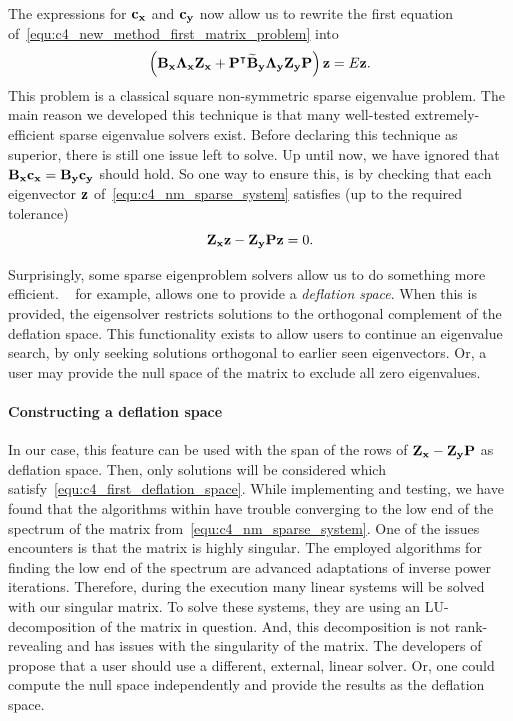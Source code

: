 The expressions for $\vb{c_x}$ and $\vb{c_y}$ now allow us to rewrite the first equation of~\eqref{equ:c4_new_method_first_matrix_problem} into
\begin{equation}\label{equ:c4_nm_sparse_system}
    \left(\vb{B_x}\vb{\Lambda_x} \vb{Z_x} + {\vb{P}}^\intercal\vb{\widetilde{B}_y}\vb{\Lambda_y}  \vb{Z_y} \vb{P}\right) \vb{z} = E \vb{z} \text{.}
\end{equation}
This problem is a classical square non-symmetric sparse eigenvalue problem. The main reason we developed this technique is that many well-tested extremely-efficient sparse eigenvalue solvers exist. Before declaring this technique as superior, there is still one issue left to solve. Up until now, we have ignored that $\vb{B_x} \vb{c_x} = \vb{B_y} \vb{c_y}$ should hold. So one way to ensure this, is by checking that each eigenvector $\vb{z}$ of~\eqref{equ:c4_nm_sparse_system} satisfies (up to the required tolerance)
\begin{equation}\label{equ:c4_first_deflation_space}
    \vb{Z_x} \vb{z} -\vb{Z_y} \vb{P} \vb{z} =0 \text{.}
\end{equation}

Surprisingly, some sparse eigenproblem solvers allow us to do something more efficient. \slepc{}~\cite{hernandez_slepc_2005} for example, allows one to provide a \emph{deflation space}. When this is provided, the eigensolver restricts solutions to the orthogonal complement of the deflation space. This functionality exists to allow users to continue an eigenvalue search, by only seeking solutions orthogonal to earlier seen eigenvectors. Or, a user may provide the null space of the matrix to exclude all zero eigenvalues.

\paragraph{Constructing a deflation space}
In our case, this feature can be used with the span of the rows of $\vb{Z_x} - \vb{Z_y} \vb{P}$ as deflation space. Then, only solutions will be considered which satisfy~\eqref{equ:c4_first_deflation_space}. While implementing and testing, we have found that the algorithms within \slepc{} have trouble converging to the low end of the spectrum of the matrix from~\eqref{equ:c4_nm_sparse_system}. One of  the issues \slepc{} encounters is that the matrix is highly singular. The employed algorithms for finding the low end of the spectrum are advanced adaptations of inverse power iterations. Therefore, during the execution many linear systems will be solved with our singular matrix. To solve these systems, they are using an LU-decomposition of the matrix in question. And, this decomposition is not rank-revealing and has issues with the singularity of the matrix. The developers of \slepc{} propose that a user should use a different, external, linear solver. Or, one could compute the null space independently and provide the results as the deflation space.

